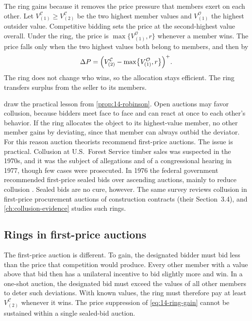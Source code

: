 The ring gains because it removes the price pressure that members exert on each other. Let
$V^{\mathcal C}_{(1)}\ge V^{\mathcal C}_{(2)}$ be the two highest member values and $V^{\mathcal O}_{(1)}$
the highest outsider value. Competitive bidding sets the price at the second-highest value overall.
Under the ring, the price is $\max\{V^{\mathcal O}_{(1)},r\}$ whenever a member wins. The price
falls only when the two highest values both belong to members, and then by
\begin{equation}\label{eq:14-ring-gain}
\Delta P=\Bigl(V^{\mathcal C}_{(2)}-\max\bigl\{V^{\mathcal O}_{(1)},r\bigr\}\Bigr)^+ .
\end{equation}
The ring does not change who wins, so the allocation stays efficient. The ring transfers surplus
from the seller to its members.

 draw the practical lesson from \cref{prop:14-robinson}.
Open auctions may favor collusion, because bidders meet face to face and can react at once to each
other's behavior. If the ring allocates the object to its highest-value member, no other member gains
by deviating, since that member can always outbid the deviator. For this reason auction theorists
recommend first-price auctions. The issue is practical. Collusion at U.S.\ Forest Service timber sales
was suspected in the 1970s, and it was the subject of allegations and of a congressional hearing in
1977, though few cases were prosecuted. In 1976 the federal government recommended first-price sealed
bids over ascending auctions, mainly to reduce collusion \citep[Section~2.4, p.~96]{HortacsuPerrigne2021}.
Sealed bids are no cure, however. The same survey reviews collusion in first-price procurement auctions
of construction contracts (their Section~3.4), and \cref{ch:collusion-evidence} studies such rings.

\subsection{Rings in first-price auctions}\label{sec:14-collusion-fpa}

The first-price auction is different. To gain, the designated bidder must bid less than the price
that competition would produce. Every other member with a value above that bid then has a unilateral
incentive to bid slightly more and win. In a one-shot auction, the designated bid must exceed the
values of all other members to deter such deviations. With known values, the ring must therefore pay
at least $V^{\mathcal C}_{(2)}$ whenever it wins. The price suppression of \eqref{eq:14-ring-gain}
cannot be sustained within a single sealed-bid auction.

